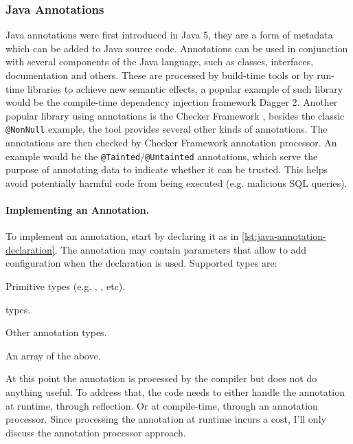 \subsubsection*{Java Annotations}\label{sec:lang-preprocessors:java:annotation}

Java annotations were first introduced in Java 5,
they are a form of metadata which can be added to Java source code.
Annotations can be used in conjunction with several components of the Java language,
such as classes, interfaces, documentation and others.
These are processed by build-time tools or by run-time libraries to achieve new semantic effects,
a popular example of such library would be the compile-time dependency injection framework Dagger 2.
Another popular library using annotations is the Checker Framework \autocite{CheckerFramework2018},
besides the classic \texttt{@NonNull} example, the tool provides several other kinds of annotations.
The annotations are then checked by Checker Framework annotation processor.
An example would be the \texttt{@Tainted}/\texttt{@Untainted} annotations,
which serve the purpose of annotating data to indicate whether it can be trusted.
This helps avoid potentially harmful code from being executed (e.g. malicious SQL queries).







\paragraph{Implementing an Annotation.}
To implement an annotation, start by declaring it as in \autoref{lst:java-annotation-declaration}.
The annotation may contain parameters that allow to add configuration when the declaration is used.
Supported types are:
\begin{compactitem}
	\item Primitive types (e.g. , , etc).
	\item {}
	\item {}
	\item {} types.
	\item Other annotation types.
	\item An array of the above.
\end{compactitem}
At this point the annotation is processed by the compiler but does not do anything useful.
To address that, the code needs to either handle the annotation at runtime, through reflection.
Or at compile-time, through an annotation processor.
Since processing the annotation at runtime incurs a cost, I'll only discuss the annotation processor approach.

